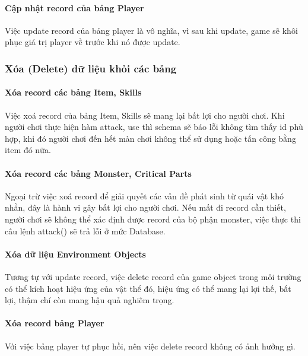 \paragraph{Cập nhật record của bảng Player}
Việc update record của bảng player là vô nghĩa, vì sau khi update, game sẽ khôi phục giá trị player về trước khi nó được update.

\subsubsection{Xóa (Delete) dữ liệu khỏi các bảng}

\paragraph{Xóa record các bảng Item, Skills}
Việc xoá record của bảng Item, Skills sẽ mang lại bất lợi cho người chơi. Khi người chơi thực hiện hàm attack, use thì schema sẽ báo lỗi không tìm thấy id phù hợp, khi đó người chơi đến hết màn chơi không thể sử dụng hoặc tấn công bằng item đó nữa.

\paragraph{Xóa record các bảng Monster, Critical Parts}
Ngoại trừ việc xoá record để giải quyết các vấn đề phát sinh từ quái vật khó nhằn, đây là hành vi gây bất lợi cho người chơi. Nếu mất đi record cần thiết, người chơi sẽ không thể xác định được record của bộ phận monster, việc thực thi câu lệnh attack() sẽ trả lỗi ở mức Database.

\paragraph{Xóa dữ liệu Environment Objects}
Tương tự với update record, việc delete record của game object trong môi trường có thể kích hoạt hiệu ứng của vật thể đó, hiệu ứng có thể mang lại lợi thế, bất lợi, thậm chí còn mang hậu quả nghiêm trọng.

\paragraph{Xóa record bảng Player}
Với việc bảng player tự phục hồi, nên việc delete record không có ảnh hưởng gì.


